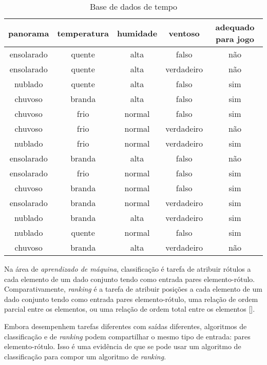 \begin{table}[h!]
    \centering
    \begin{tabular}{ccccc}
        \hline
        panorama & temperatura & humidade & ventoso & adequado para jogo \\
        \hline
        ensolarado & quente & alta & falso & não \\
        ensolarado & quente & alta & verdadeiro & não \\
        nublado & quente & alta & falso & sim \\
        chuvoso & branda & alta & falso & sim \\
        chuvoso & frio & normal & falso & sim \\
        chuvoso & frio & normal & verdadeiro & não \\
        nublado & frio & normal & verdadeiro & sim \\
        ensolarado & branda & alta & falso & não \\
        ensolarado & frio & normal & falso & sim \\
        chuvoso & branda & normal & falso & sim \\
        ensolarado & branda & normal & verdadeiro & sim \\
        nublado & branda & alta & verdadeiro & sim \\
        nublado & quente & normal & falso & sim \\
        chuvoso & branda & alta & verdadeiro & não \\
        \hline
    \end{tabular}

    \caption{Base de dados de tempo}
\end{table}


Na área de \emph{aprendizado de máquina}, classificação é tarefa de atribuir rótulos a cada elemento de um dado conjunto tendo como entrada pares elemento-rótulo. Comparativamente, \emph{ranking} é a tarefa de atribuir posições a cada elemento de um dado conjunto tendo como entrada pares elemento-rótulo, uma relação de ordem parcial entre os elementos, ou uma relação de ordem total entre os elementos [\cite{tieyan09}].

Embora desempenhem tarefas diferentes com saídas diferentes, algoritmos de classificação e de \emph{ranking} podem compartilhar o mesmo tipo de entrada: pares elemento-rótulo. Isso é uma evidência de que se pode usar um algoritmo de classificação para compor um algoritmo de \emph{ranking}.

